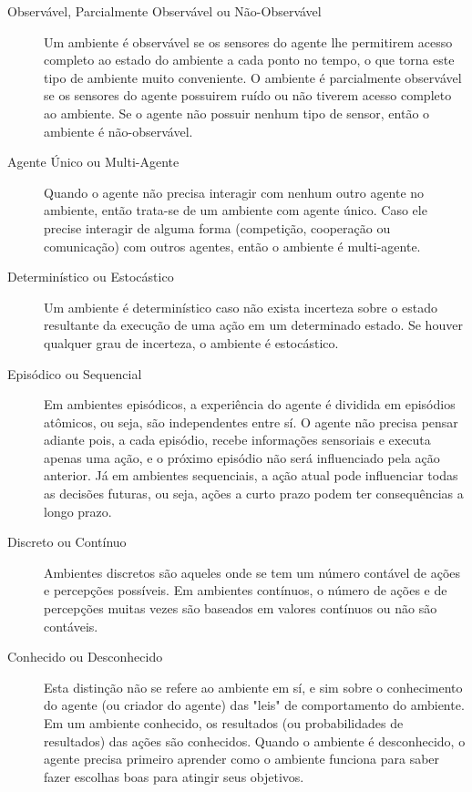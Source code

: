 \begin{description}
	\item[Observável, Parcialmente Observável ou Não-Observável]
		Um ambiente é observável se os sensores do agente lhe permitirem acesso
		completo ao estado do ambiente a cada ponto no tempo, o que torna este
		tipo de ambiente muito conveniente. O ambiente é parcialmente observável
		se os sensores do agente possuirem ruído ou não tiverem acesso completo
		ao ambiente. Se o agente não possuir nenhum tipo de sensor, então o
		ambiente é não-observável.

	\item[Agente Único ou Multi-Agente]
		Quando o agente não precisa interagir com nenhum outro agente no
		ambiente, então trata-se de um ambiente com agente único. Caso ele
		precise interagir de alguma forma (competição, cooperação ou
		comunicação) com outros agentes, então o ambiente é multi-agente.

	\item[Determinístico ou Estocástico]
		Um ambiente é determinístico caso não exista incerteza sobre o estado
		resultante da execução de uma ação em um determinado estado. Se houver
		qualquer grau de incerteza, o ambiente é estocástico.

	\item[Episódico ou Sequencial]
		Em ambientes episódicos, a experiência do agente é dividida em episódios
		atômicos, ou seja, são independentes entre sí. O agente não precisa
		pensar adiante pois, a cada episódio, recebe informações sensoriais e
		executa apenas uma ação, e o próximo episódio não será influenciado pela
		ação anterior. Já em ambientes sequenciais, a ação atual pode
		influenciar todas as decisões futuras, ou seja, ações a curto prazo
		podem ter consequências a longo prazo.

	\item[Discreto ou Contínuo]
		Ambientes discretos são aqueles onde se tem um número contável de ações
		e percepções possíveis. Em ambientes contínuos, o número de ações e de
		percepções muitas vezes são baseados em valores contínuos ou não são
		contáveis.

	\item[Conhecido ou Desconhecido]
		Esta distinção não se refere ao ambiente em sí, e sim sobre o
		conhecimento do agente (ou criador do agente) das "leis" de
		comportamento do ambiente. Em um ambiente conhecido, os resultados (ou
		probabilidades de resultados) das ações são conhecidos. Quando o
		ambiente é desconhecido, o agente precisa primeiro aprender como o
		ambiente funciona para saber fazer escolhas boas para atingir seus
		objetivos.
\end{description}


